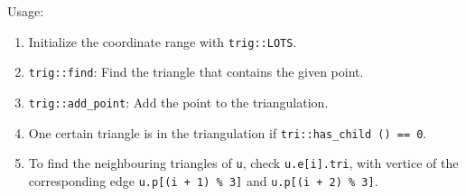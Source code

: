 Usage:
\begin{enumerate}
\item Initialize the coordinate range with \texttt{trig::LOTS}.
\item \texttt{trig::find}: Find the triangle that contains the given point.
\item \texttt{trig::add\_point}: Add the point to the triangulation.
\item One certain triangle is in the triangulation if \texttt{tri::has\_child () == 0}.
\item To find the neighbouring triangles of \texttt{u}, check \texttt{u.e[i].tri}, with vertice of the corresponding edge \texttt{u.p[(i + 1) \% 3]} and \texttt{u.p[(i + 2) \% 3]}.
\end{enumerate}


